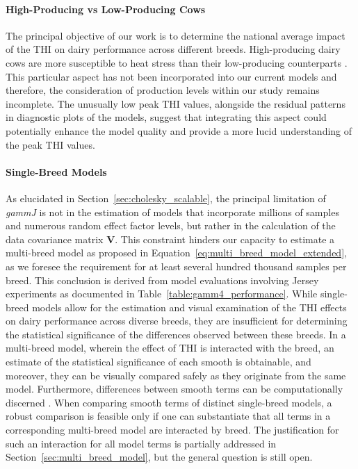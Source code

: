 \paragraph{High-Producing vs Low-Producing Cows}
The principal objective of our work is to determine the national average impact of the THI on dairy performance across different breeds. High-producing dairy cows are more susceptible to heat stress than their low-producing counterparts \citep{kadzere_heat_2002, de_rensis_seasonal_2015}. This particular aspect has not been incorporated into our current models and therefore, the consideration of production levels within our study remains incomplete. The unusually low peak THI values, alongside the residual patterns in diagnostic plots of the models, suggest that integrating this aspect could potentially enhance the model quality and provide a more lucid understanding of the peak THI values.

\paragraph{Single-Breed Models}
As elucidated in Section~\ref{sec:cholesky_scalable}, the principal limitation of \textit{gammJ} is not in the estimation of models that incorporate millions of samples and numerous random effect factor levels, but rather in the calculation of the data covariance matrix $\mathbf{V}$. This constraint hinders our capacity to estimate a multi-breed model as proposed in Equation~\ref{eq:multi_breed_model_extended}, as we foresee the requirement for at least several hundred thousand samples per breed. This conclusion is derived from model evaluations involving Jersey experiments as documented in Table~\ref{table:gamm4_performance}. While single-breed models allow for the estimation and visual examination of the THI effects on dairy performance across diverse breeds, they are insufficient for determining the statistical significance of the differences observed between these breeds. In a multi-breed model, wherein the effect of THI is interacted with the breed, an estimate of the statistical significance of each smooth is obtainable, and moreover, they can be visually compared safely as they originate from the same model. Furthermore, differences between smooth terms can be computationally discerned \citep{gavin2017difference, gavin2017differenceII}. When comparing smooth terms of distinct single-breed models, a robust comparison is feasible only if one can substantiate that all terms in a corresponding multi-breed model are interacted by breed. The justification for such an interaction for all model terms is partially addressed in Section~\ref{sec:multi_breed_model}, but the general question is still open.

